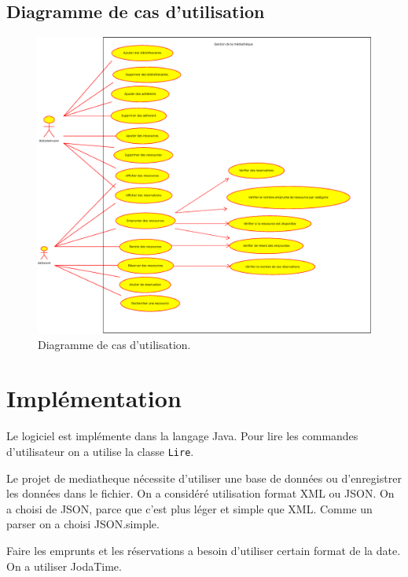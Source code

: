 \documentclass[10pt, a4paper]{article}
\begin{document}
    		 \subsection{Diagramme de cas d'utilisation}
    		 
    		 \begin{figure}[h]
			\begin{center}
				\includegraphics[width=1\textwidth]{graphics/usecasediagram.eps}
				\caption{Diagramme de cas d'utilisation.}
			\end{center}
		\end{figure}
	
	\section{Implémentation}
	Le logiciel est implémente dans la langage Java. Pour lire les commandes d'utilisateur on a utilise 
	la classe \texttt{Lire}.
	
	Le projet de mediatheque nécessite d'utiliser une base de données ou d'enregistrer les données dans le 
	fichier.
	On a considéré utilisation format XML ou JSON. On a choisi de JSON, parce que c'est plus léger et 
	simple que XML. Comme un parser on a choisi JSON.simple.
	
	Faire les emprunts et les réservations a besoin d'utiliser certain format de la date. On a utiliser 
	JodaTime.
	
\end{document}
